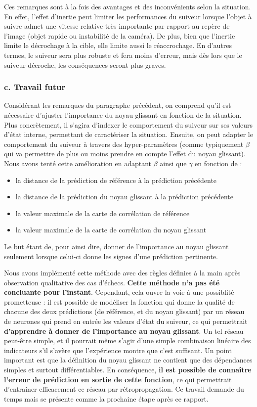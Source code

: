 \documentclass[10pt,twocolumn,letterpaper,french]{article}
\begin{document}
Ces remarques sont à la fois des avantages et des inconvénients selon la situation. En effet, l'effet d'inertie peut limiter les performances du suiveur lorsque l'objet à suivre admet une vitesse relative très importante par rapport au repère de l'image (objet rapide ou instabilité de la caméra). De plus, bien que l'inertie limite le décrochage à la cible, elle limite aussi le réaccrochage. En d'autres termes, le suiveur sera plus robuste et fera moins d'erreur, mais dès lors que le suiveur décroche, les conséquences seront plus graves.

\subsubsection*{c. Travail futur}

Considérant les remarques du paragraphe précédent, on comprend qu'il est nécessaire d'ajuster l'importance du noyau glissant en fonction de la situation. Plus concrètement, il s'agira d'indexer le comportement du suiveur sur ses valeurs d'état interne, permettant de caractériser la situation. Ensuite, on peut adapter le comportement du suiveur à travers des hyper-paramètres (comme typiquement $\beta$ qui va permettre de plus ou moins prendre en compte l'effet du noyau glissant). Nous avons tenté cette amélioration en adaptant $\beta$ ainsi que $\gamma$ en fonction de :
\begin{itemize}
  \item la distance de la prédiction de référence à la prédiction précédente
  \item la distance de la prédiction du noyau glissant à la prédiction précédente
  \item la valeur maximale de la carte de corrélation de référence
  \item la valeur maximale de la carte de corrélation du noyau glissant
\end{itemize}
Le but étant de, pour ainsi dire, donner de l'importance au noyau glissant seulement lorsque celui-ci donne les signes d'une prédiction pertinente.

Nous avons implémenté cette méthode avec des règles définies à la main après observation qualitative des cas d'échecs. \textbf{Cette méthode n'a pas été concluante pour l'instant}. Cependant, cela ouvre la voie à une possiblité prometteuse : il est possible de modéliser la fonction qui donne la qualité de chacune des deux prédictions (de référence, et du noyau glissant) par un réseau de neurones qui prend en entrée les valeurs d'état du suiveur, ce qui permettrait \textbf{d'apprendre à donner de l'importance au noyau glissant}. Un tel réseau peut-être simple, et il pourrait même s'agir d'une simple combinaison linéaire des indicateurs s'il s'avère que l'expérience montre que c'est suffisant. Un point important est que la définition du noyau glissant ne contient que des dépendances simples et surtout différentiables. En conséquence, \textbf{il est possible de connaître l'erreur de prédiction en sortie de cette fonction}, ce qui permettrait d'entrainer efficacement ce réseau par rétropropagation. Ce travail demande du temps mais se présente comme la prochaine étape après ce rapport.
\end{document}

